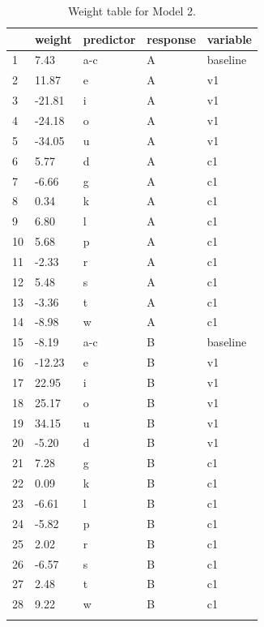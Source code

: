 \begin{table}[!htpb]
  \centering
  \begin{tabular}{lllll}
    \lsptoprule
       & weight & predictor & response & variable \\
    \midrule
    1  & 7.43   & a-c       & A        & baseline \\
    2  & 11.87  & e         & A        & v1       \\
    3  & -21.81 & i         & A        & v1       \\
    4  & -24.18 & o         & A        & v1       \\
    5  & -34.05 & u         & A        & v1       \\
    6  & 5.77   & d         & A        & c1       \\
    7  & -6.66  & g         & A        & c1       \\
    8  & 0.34   & k         & A        & c1       \\
    9  & 6.80   & l         & A        & c1       \\
    10 & 5.68   & p         & A        & c1       \\
    11 & -2.33  & r         & A        & c1       \\
    12 & 5.48   & s         & A        & c1       \\
    13 & -3.36  & t         & A        & c1       \\
    14 & -8.98  & w         & A        & c1       \\
    15 & -8.19  & a-c       & B        & baseline \\
    16 & -12.23 & e         & B        & v1       \\
    17 & 22.95  & i         & B        & v1       \\
    18 & 25.17  & o         & B        & v1       \\
    19 & 34.15  & u         & B        & v1       \\
    20 & -5.20  & d         & B        & v1       \\
    21 & 7.28   & g         & B        & c1       \\
    22 & 0.09   & k         & B        & c1       \\
    23 & -6.61  & l         & B        & c1       \\
    24 & -5.82  & p         & B        & c1       \\
    25 & 2.02   & r         & B        & c1       \\
    26 & -6.57  & s         & B        & c1       \\
    27 & 2.48   & t         & B        & c1       \\
    28 & 9.22   & w         & B        & c1       \\
    \lspbottomrule
  \end{tabular}\caption{Weight table for Model 2.}\label{tab:model2-weights}
\end{table}

